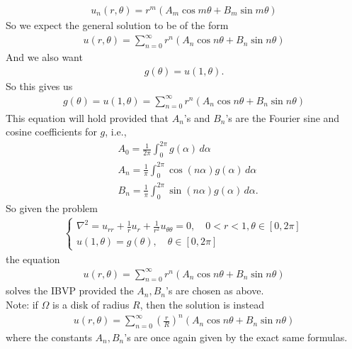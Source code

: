 \documentclass{book}
\theoremstyle{definition}
\newcommand{\f}[2]{\frac{#1}{#2}}
\begin{document}
\begin{align*}
\boxed{u_n(r,\theta) = r^m(A_m\cos m\theta + B_m\sin m\theta )}
\end{align*}
So we expect the general solution to be of the form
\begin{align*}
\boxed{u(r,\theta) = \sum^\infty_{n=0}r^n(A_n\cos n\theta + B_n\sin n\theta )}
\end{align*}
And we also want
\begin{align*}
g(\theta) = u(1,\theta).
\end{align*}
So this gives us
\begin{align*}
g(\theta) = u(1,\theta) = \sum^\infty_{n=0}r^n(A_n\cos n\theta + B_n\sin n\theta )
\end{align*}
This equation will hold provided that $A_n$'s and $B_n$'s are the Fourier sine and cosine coefficients for $g$, i.e., 
\begin{align*}
&A_0 = \f{1}{2\pi}\int^{2\pi}_0 g(\alpha)\,d\alpha\\
&A_n = \f{1}{\pi}\int^{2\pi}_0 \cos(n\alpha)g(\alpha)\,d\alpha\\
&B_n = \f{1}{\pi}\int^{2\pi}_0 \sin(n\alpha)g(\alpha)\,d\alpha.
\end{align*}
So given the problem 
\begin{align*}
\begin{cases}
\nabla^2 = u_{rr} + \frac{1}{r}u_r + \frac{1}{r^2}u_{\theta\theta} = 0, \quad 0<r<1, \theta\in[0,2\pi]\\
u(1,\theta) = g(\theta), \quad \theta \in [0,2\pi]
\end{cases}
\end{align*}
the equation 
\begin{align*}
\boxed{u(r,\theta) = \sum^\infty_{n=0}r^n(A_n\cos n\theta + B_n\sin n\theta )}
\end{align*}
solves the IBVP provided the $A_n,B_n$'s are chosen as above.\\

Note: if $\Omega$ is a disk of radius $R$, then the solution is instead
\begin{align*}
\boxed{u(r,\theta) = \sum^\infty_{n=0}\left(\f{r}{R}\right)^n(A_n\cos n\theta + B_n\sin n\theta )}
\end{align*}
where the constants $A_n,B_n$'s are once again given by the exact same formulas.\\
\end{document}
